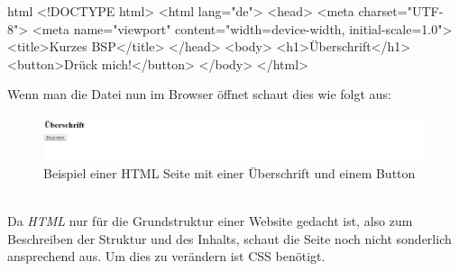 		\begin{code}{html}
			<!DOCTYPE html>
			<html lang="de">
				<head>
					<meta charset="UTF-8">
					<meta name="viewport" content="width=device-width, initial-scale=1.0">
					<title>Kurzes BSP</title>
				</head>
				<body>
					<h1>Überschrift</h1>
					<button>Drück mich!</button>
				</body>
			</html>
		\end{code}
		Wenn man die Datei nun im Browser öffnet schaut dies wie folgt aus:
		\begin{figure}[H]
			\centering
			\includegraphics[width=1\linewidth]{images/html1}
			\caption[HTML Beispielseite]{Beispiel einer HTML Seite mit einer Überschrift und einem Button}
			\label{fig:htmlbsp}
		\end{figure}
		~\\
		Da \textit{HTML} nur für die Grundstruktur einer Website gedacht ist, also zum Beschreiben der Struktur und des Inhalts, schaut die Seite noch nicht sonderlich ansprechend aus. Um dies zu verändern ist CSS benötigt.
		
